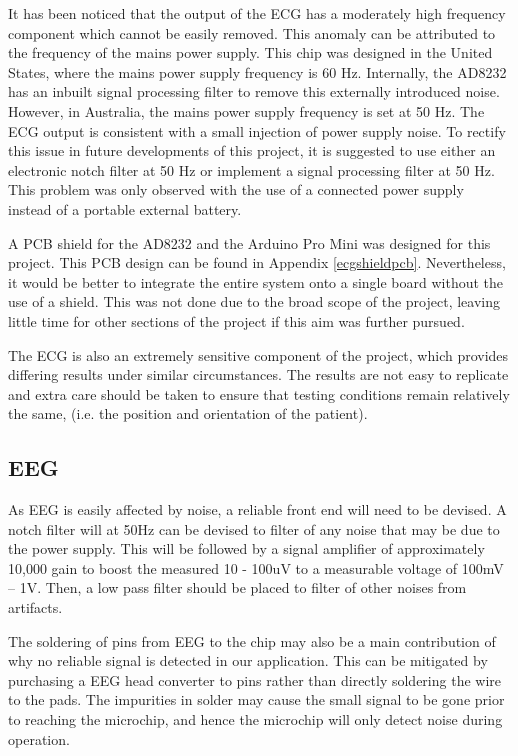 It has been noticed that the output of the ECG has a moderately high frequency component which cannot be easily removed. This anomaly can be attributed to the frequency of the mains power supply. This chip was designed in the United States, where the mains power supply frequency is 60 Hz. Internally, the AD8232 has an inbuilt signal processing filter to remove this externally introduced noise. However, in Australia, the mains power supply frequency is set at 50 Hz. The ECG output is consistent with a small injection of power supply noise. To rectify this issue in future developments of this project, it is suggested to use either an electronic notch filter at 50 Hz or implement a signal processing filter at 50 Hz. This problem was only observed with the use of a connected power supply instead of a portable external battery. 

A PCB shield for the AD8232 and the Arduino Pro Mini was designed for this project. This PCB design can be found in Appendix \ref{ecgshieldpcb}. Nevertheless, it would be better to integrate the entire system onto a single board without the use of a shield. This was not done due to the broad scope of the project, leaving little time for other sections of the project if this aim was further pursued. 

The ECG is also an extremely sensitive component of the project, which provides differing results under similar circumstances. The results are not easy to replicate and extra care should be taken to ensure that testing conditions remain relatively the same, (i.e. the position and orientation of the patient). 

\subsection{EEG}
As EEG is easily affected by noise, a reliable front end will need to be devised. A notch filter will at 50Hz can be devised to filter of any noise that may be due to the power supply. This will be followed by a signal amplifier of approximately 10,000 gain to boost the measured 10 - 100uV to a measurable voltage of 100mV – 1V. Then, a low pass filter should be placed to filter of other noises from artifacts. 

The soldering of pins from EEG to the chip may also be a main contribution of why no reliable signal is detected in our application. This can be mitigated by purchasing a EEG head converter to pins rather than directly soldering the wire to the pads. The impurities in solder may cause the small signal to be gone prior to reaching the microchip, and hence the microchip will only detect noise during operation.

